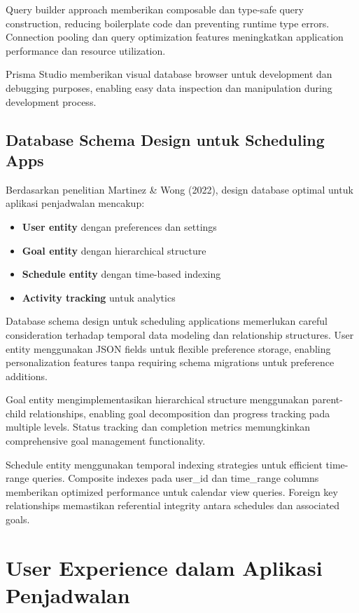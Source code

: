 Query builder approach memberikan composable dan type-safe query construction, reducing boilerplate code dan preventing runtime type errors. Connection pooling dan query optimization features meningkatkan application performance dan resource utilization.

Prisma Studio memberikan visual database browser untuk development dan debugging purposes, enabling easy data inspection dan manipulation during development process.

\subsection{Database Schema Design untuk Scheduling Apps}

Berdasarkan penelitian Martinez \& Wong (2022), design database optimal untuk aplikasi penjadwalan mencakup:

\begin{itemize}
\item \textbf{User entity} dengan preferences dan settings
\item \textbf{Goal entity} dengan hierarchical structure
\item \textbf{Schedule entity} dengan time-based indexing
\item \textbf{Activity tracking} untuk analytics
\end{itemize}

Database schema design untuk scheduling applications memerlukan careful consideration terhadap temporal data modeling dan relationship structures. User entity menggunakan JSON fields untuk flexible preference storage, enabling personalization features tanpa requiring schema migrations untuk preference additions.

Goal entity mengimplementasikan hierarchical structure menggunakan parent-child relationships, enabling goal decomposition dan progress tracking pada multiple levels. Status tracking dan completion metrics memungkinkan comprehensive goal management functionality.

Schedule entity menggunakan temporal indexing strategies untuk efficient time-range queries. Composite indexes pada user\_id dan time\_range columns memberikan optimized performance untuk calendar view queries. Foreign key relationships memastikan referential integrity antara schedules dan associated goals.

\section{User Experience dalam Aplikasi Penjadwalan}

